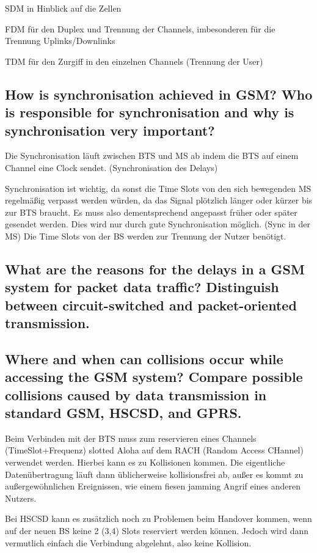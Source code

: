 SDM in Hinblick auf die Zellen

FDM für den Duplex und Trennung der Channels, imbesonderen für die Trennung Uplinks/Downlinks

TDM für den Zurgiff in den einzelnen Channels (Trennung der User)

\subsection{How is synchronisation achieved in GSM? Who is responsible for synchronisation and why is synchronisation very important?}

Die Synchronisation läuft zwischen BTS und MS ab indem die BTS auf einem Channel eine Clock sendet. (Synchronisation des Delays)

Synchronisation ist wichtig, da sonst die Time Slots von den sich bewegenden MS regelmäßig verpasst werden würden, da das Signal plötzlich länger oder kürzer bis zur BTS braucht. Es muss also dementsprechend angepasst früher oder später gesendet werden. Dies wird nur durch gute Synchronisation möglich. (Sync in der MS)
Die Time Slots von der BS werden zur Trennung der Nutzer benötigt.

\subsection{What are the reasons for the delays in a GSM system for packet data traffic? Distinguish between circuit-switched and packet-oriented transmission.}

\subsection{Where and when can collisions occur while accessing the GSM system? Compare possible collisions caused by data transmission in standard GSM, HSCSD, and GPRS.}
Beim Verbinden mit der BTS muss zum reservieren eines Channels (TimeSlot+Frequenz) slotted Aloha auf dem RACH (Random Access CHannel) verwendet werden. Hierbei kann es zu Kollisionen kommen. Die eigentliche Datenübertragung läuft dann üblicherweise kollisionsfrei ab, außer es kommt zu außergewöhnlichen Ereignissen, wie einem fiesen jamming Angrif eines anderen Nutzers.

Bei HSCSD kann es zusätzlich noch zu Problemen beim Handover kommen, wenn auf der neuen BS keine 2 (3,4) Slots reserviert werden können. Jedoch wird dann vermutlich einfach die Verbindung abgelehnt, also keine Kollision. 


